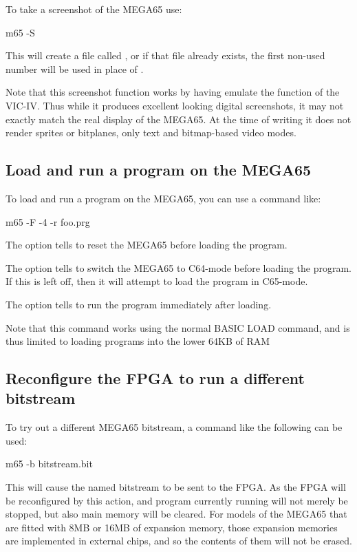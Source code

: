 To take a screenshot of the MEGA65 use:

\begin{screencode}
m65 -S
\end{screencode}

This will create a file called ,
or if that file already exists, the first non-used number will be used
in place of .

Note that this screenshot function works by having  emulate the
function of the VIC-IV. Thus while it produces excellent looking
digital screenshots, it may not exactly match the real display of the
MEGA65.  At the time of writing it does not render sprites or
bitplanes, only text and bitmap-based video modes.

\subsection{Load and run a program on the MEGA65}

To load and run a program on the MEGA65, you can use a command like:

\begin{screencode}
m65 -F -4 -r foo.prg
\end{screencode}

The  option tells  to reset the MEGA65
before loading the program.

The  option tells  to switch the MEGA65
to C64-mode before loading the program. If this is left off, then it
will attempt to load the program in C65-mode.

The  option tells  to run the program
immediately after loading.

Note that this command works using the normal BASIC LOAD command, and
is thus limited to loading programs into the lower 64KB of RAM

\subsection{Reconfigure the FPGA to run a different bitstream}

To try out a different MEGA65 bitstream, a command like the following can be
used:

\begin{screencode}
m65 -b bitstream.bit
\end{screencode}

This will cause the named bitstream to be sent to the FPGA.  As the
FPGA will be reconfigured by this action, and program currently
running will not merely be stopped, but also main memory will be
cleared. For models of the MEGA65 that are fitted with 8MB or 16MB of
expansion memory, those expansion memories are implemented in external
chips, and so the contents of them will not be erased.


